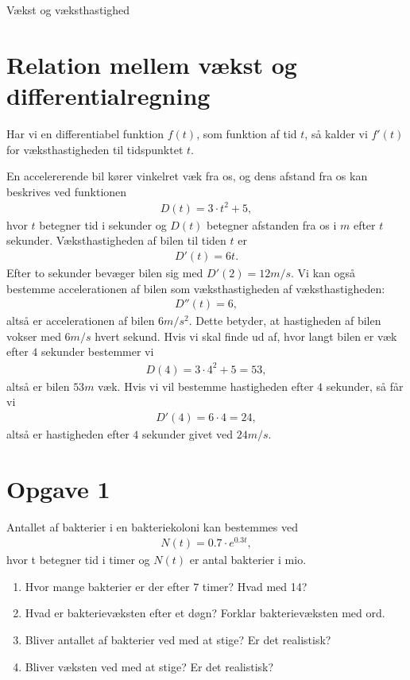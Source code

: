 \begin{center}
\Huge
Vækst og væksthastighed
\end{center}

\section*{Relation mellem vækst og differentialregning}

\begin{defn}
Har vi en differentiabel funktion $f(t)$, som funktion af tid $t$, så kalder vi $f'(t)$ for væksthastigheden til tidspunktet $t$. 
\end{defn}
\begin{exa}
En accelererende bil kører vinkelret væk fra os, og dens afstand fra os kan beskrives ved funktionen \begin{align*}
D(t) = 3\cdot t^2 + 5,
\end{align*}
hvor $t$ betegner tid i sekunder og $D(t)$ betegner afstanden fra os i $m$ efter $t$ sekunder. Væksthastigheden af bilen til tiden $t$ er 
\begin{align*}
D'(t) = 6t.
\end{align*}
Efter to sekunder bevæger bilen sig med $D'(2) = 12 m/s.$ Vi kan også bestemme accelerationen af bilen som væksthastigheden af væksthastigheden:
\begin{align*}
D''(t) = 6,
\end{align*}
altså er accelerationen af bilen $6m/s^2$. Dette betyder, at hastigheden af bilen vokser med $6m/s$ hvert sekund.  
Hvis vi skal finde ud af, hvor langt bilen er væk efter $4$ sekunder bestemmer vi
\begin{align*}
D(4) = 3\cdot 4^2 +5 = 53,
\end{align*}
altså er bilen $53 m$ væk. 
Hvis vi vil bestemme hastigheden efter $4$ sekunder, så får vi 
\begin{align*}
D'(4) = 6\cdot 4 = 24, 
\end{align*}
altså er hastigheden efter $4$ sekunder givet ved $24 m/s$.
\end{exa}
\section*{Opgave 1}
Antallet af bakterier i en bakteriekoloni kan bestemmes ved
\begin{align*}
N(t) = 0.7\cdot e^{0.3t},
\end{align*}
hvor t betegner tid i timer og $N(t)$ er antal bakterier i mio. 
\begin{enumerate}
\item Hvor mange bakterier er der efter $7$ timer? Hvad med 14?
\item Hvad er bakterievæksten efter et døgn? Forklar bakterievæksten med ord.
\item Bliver antallet af bakterier ved med at stige? Er det realistisk? 
\item Bliver væksten ved med at stige? Er det realistisk?
\end{enumerate}
